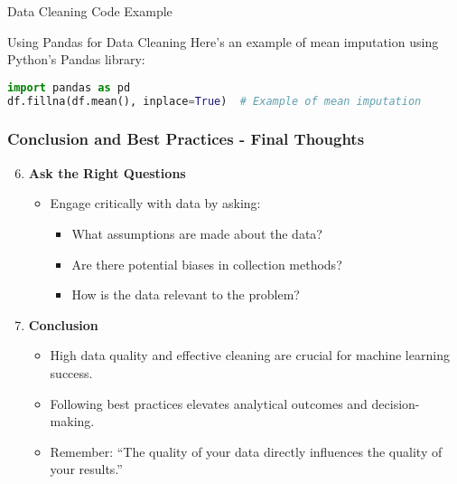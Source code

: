 \documentclass[aspectratio=169]{beamer}
\begin{document}
\begin{frame}[fragile]{Data Cleaning Code Example}
  \begin{block}{Using Pandas for Data Cleaning}
    Here's an example of mean imputation using Python's Pandas library:
    \begin{lstlisting}[language=Python]
import pandas as pd
df.fillna(df.mean(), inplace=True)  # Example of mean imputation
    \end{lstlisting}
  \end{block}
\end{frame}

\begin{frame}[fragile]
  \frametitle{Conclusion and Best Practices - Final Thoughts}

  \begin{enumerate}
    \setcounter{enumi}{5}
    \item \textbf{Ask the Right Questions}
    \begin{itemize}
      \item Engage critically with data by asking:
      \begin{itemize}
        \item What assumptions are made about the data?
        \item Are there potential biases in collection methods?
        \item How is the data relevant to the problem?
      \end{itemize}
    \end{itemize}
    
    \item \textbf{Conclusion}
    \begin{itemize}
      \item High data quality and effective cleaning are crucial for machine learning success.
      \item Following best practices elevates analytical outcomes and decision-making.
      \item Remember: “The quality of your data directly influences the quality of your results.”
    \end{itemize}
  \end{enumerate}
\end{frame}
\end{document}
